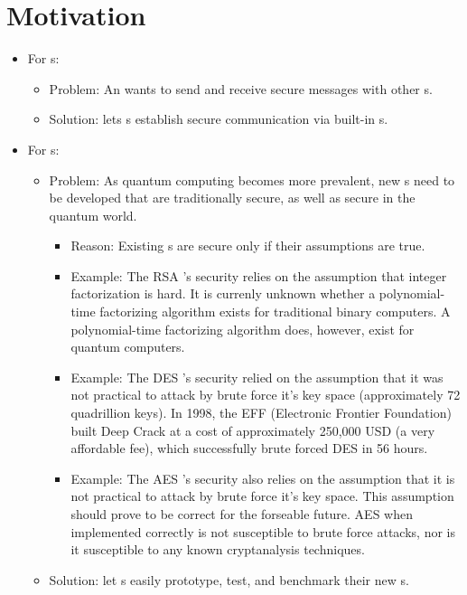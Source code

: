 
\section{Motivation}

\begin{itemize}
\item For \eu s:
  \begin{itemize}
  \item Problem: An \eu{} wants to send and receive
    secure messages with other \eu s.
  \item Solution: \cry{} lets \eu s establish
    secure communication via built-in \cs s.
  \end{itemize}
\item For \cg s:
  \begin{itemize}
  \item Problem: As quantum computing becomes more prevalent,
  new \cs s need to be developed that are traditionally secure,
  as well as secure in the quantum world.
    \begin{itemize}
    \item Reason: Existing \cs s are secure
      only if their assumptions are true.
    \item Example: The RSA \cs's security relies on
      the assumption that integer factorization is hard.
      It is currenly unknown whether a polynomial-time
      factorizing algorithm exists for traditional binary
      computers. A polynomial-time factorizing algorithm
      does, however, exist for quantum computers.
    \item Example: The DES \cs's security relied on the assumption
      that it was not practical to attack by brute force it's key space
      (approximately 72 quadrillion keys). In 1998, the EFF (Electronic
      Frontier Foundation) built Deep Crack at a cost of approximately
      250,000 USD (a very affordable fee), which successfully brute
      forced DES in 56 hours.
    \item Example: The AES \cs's security also relies on the assumption
      that it is not practical to attack by brute force it's key space.
      This assumption should prove to be correct for the forseable future.
      AES when implemented correctly is not susceptible to brute force attacks,
      nor is it susceptible to any known cryptanalysis techniques.
    \end{itemize}
  \item Solution: \cry{} let \cg s easily prototype, test,
    and benchmark their new \cs s.
  \end{itemize}
\end{itemize}
